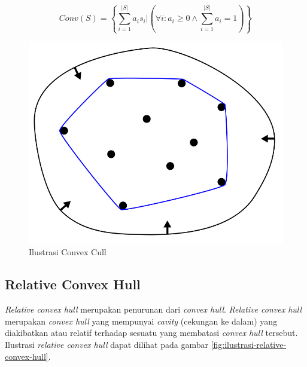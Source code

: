 \begin{equation}
    \label{eq:convex-hull}
    Conv(S)=\left\{ \sum_{i=1}^{|S|}{a_is_i} \big | (\forall{i}:a_i \ge 0 \wedge \sum_{i=1}^{|S|}{a_i=1} ) \right\}
\end{equation}
\begin{figure}[!h]
	\Centering
	\includegraphics [width=0.5\columnwidth]{bab2/img/ilustrasi-convex-hull}
	\caption {Ilustrasi Convex Cull}
	\label {fig:ilustrasi-convex-hull}
\end{figure}


\subsection{ Relative Convex Hull}
\textit{Relative convex hull} merupakan penurunan dari \textit{convex hull}. \textit{Relative convex hull} merupakan \textit{convex hull} yang mempunyai \textit{cavity} (cekungan ke dalam) yang diakibatkan atau relatif terhadap sesuatu yang membatasi \textit{convex hull} tersebut. Ilustrasi \textit{relative convex hull} dapat dilihat pada gambar \ref{fig:ilustrasi-relative-convex-hull}.

